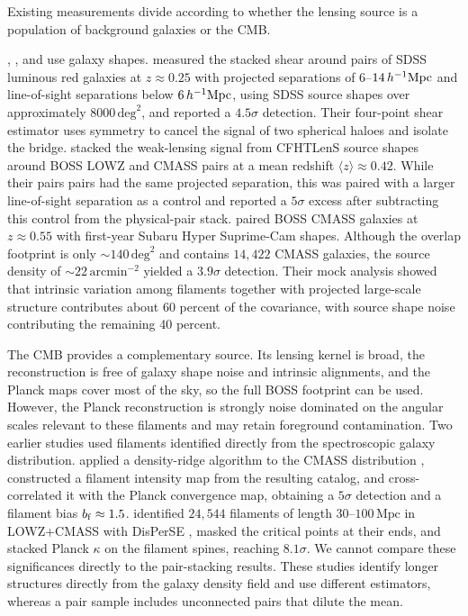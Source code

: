 \documentclass[preprint]{aastex701}
\newcommand{\hinvMpc}{h^{-1}{\rm Mpc}}
\begin{document}
Existing measurements divide according to whether the lensing source is a
population of background galaxies or the CMB.

\citet{Clampitt2016}, \citet{EppsHudson2017}, and \citet{Kondo2020} use galaxy
shapes. \citet{Clampitt2016} measured the stacked shear around pairs of SDSS luminous red galaxies at $z\approx0.25$ with projected separations of
$6$--$14\,\hinvMpc$ and line-of-sight separations below $6\,\hinvMpc$, using
SDSS source shapes over approximately $8000\,\mathrm{deg}^{2}$, and reported
a $4.5\sigma$ detection. Their four-point shear estimator uses symmetry to
cancel the signal of two spherical haloes and isolate the bridge.
\citet{EppsHudson2017} stacked the weak-lensing signal from CFHTLenS source
shapes around BOSS LOWZ and CMASS pairs at a mean redshift
$\langle z\rangle\approx0.42$. While their pairs pairs had the same projected
separation, this was paired with a larger line-of-sight separation as a control and reported a
$5\sigma$ excess after subtracting this control from the physical-pair
stack. \citet{Kondo2020} paired BOSS CMASS galaxies at $z\approx0.55$ with
first-year Subaru Hyper Suprime-Cam shapes. Although
the overlap footprint is only $\sim140\,\mathrm{deg}^{2}$ and contains
$14{,}422$ CMASS galaxies, the source density of $\sim22\,\mathrm{arcmin}^{-2}$
yielded a $3.9\sigma$ detection. Their mock analysis showed that intrinsic
variation among filaments together with projected large-scale structure
contributes about 60 percent of the covariance, with source shape noise
contributing the remaining 40 percent.

The CMB provides a complementary source. Its lensing kernel is broad, the
reconstruction is free of galaxy shape noise and intrinsic alignments, and
the Planck maps cover most of the sky, so the full BOSS footprint can be
used. However, the Planck reconstruction is strongly noise dominated on the
angular scales relevant to these filaments \citep{Planck2018lensing} and may
retain foreground contamination. Two earlier studies used filaments
identified directly from the spectroscopic galaxy distribution.
\citet{He2018} applied a density-ridge algorithm to the CMASS
distribution \citep{Chen2016}, constructed a filament intensity map from the
resulting catalog, and cross-correlated it with the Planck convergence map,
obtaining a $5\sigma$ detection and a filament bias $b_{\rm f}\approx1.5$.
\citet{Tanimura2020} identified $24{,}544$ filaments of length
$30$--$100\,\mathrm{Mpc}$ in LOWZ+CMASS with DisPerSE \citep{Sousbie2011},
masked the critical points at their ends, and stacked Planck $\kappa$ on the
filament spines, reaching $8.1\sigma$. We cannot compare these significances directly to the pair-stacking results. These studies identify longer structures
directly from the galaxy density field and use different estimators, whereas
a pair sample includes unconnected pairs that dilute the mean.
\end{document}
